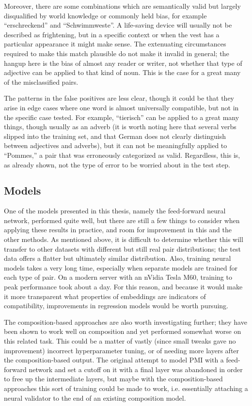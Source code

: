 \documentclass[a4paper, 11pt]{scrartcl}
\begin{document}
Moreover, there are some combinations which are semantically valid but largely disqualified by world knowledge or commonly held bias, for example ``erschreckend'' and ``Schwimmweste''. A life-saving device will usually not be described as frightening, but in a specific context or when the vest has a particular appearance it might make sense. The extenuating circumstances required to make this match plausible do not make it invalid in general; the hangup here is the bias of almost any reader or writer, not whether that type of adjective can be applied to that kind of noun. This is the case for a great many of the misclassified pairs.

The patterns in the false positives are less clear, though it could be that they arise in edge cases where one word is almost universally compatible, but not in the specific case tested. For example, ``tierisch'' can be applied to a great many things, though usually as an adverb (it is worth noting here that several verbs slipped into the training set, and that German does not clearly distinguish between adjectives and adverbs), but it can not be meaningfully applied to ``Pommes,'' a pair that was erroneously categorized as valid. Regardless, this is, as already shown, not the type of error to be worried about in the test step.

\subsection{Models}
One of the models presented in this thesis, namely the feed-forward neural network, performed quite well, but there are still a few things to consider when applying these results in practice, and room for improvement in this and the other methods. As mentioned above, it is difficult to determine whether this will transfer to other datasets with different but still real pair distributions; the test data offers a flatter but ultimately similar distribution. Also, training neural models takes a very long time, especially when separate models are trained for each type of pair. On a modern server with an nVidia Tesla M60, training to peak performance took about a day. For this reason, and because it would make it more transparent what properties of embeddings are indicators of compatibility, improvements in regression models would be worth pursuing.

The composition-based approaches are also worth investigating further; they have been shown to work well on composition and yet performed somewhat worse on this related task. This could be a matter of vastly (since small tweaks gave no improvement) incorrect hyperparameter tuning, or of needing more layers after the composition-based output. The original attempt to model PMI with a feed-forward network and set a cutoff on it with a final layer was abandoned in order to free up the intermediate layers, but maybe with the composition-based approaches this sort of training could be made to work, i.e. essentially attaching a neural validator to the end of an existing composition model.
\end{document}
